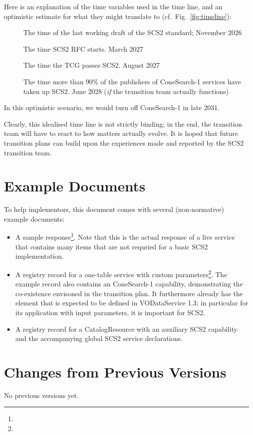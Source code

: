 \documentclass[11pt,a4paper]{ivoa}
\begin{document}
Here is an explanation of the time variables used in the time line, and
an optimistic estimate for what they might translate to
(cf.~Fig.~\ref{fig:timeline}):

\begin{description}
\item [] The time of the last working draft of the SCS2
standard; November 2026

\item[] The time SCS2 RFC starts.  March 2027

\item[] The time the TCG passes SCS2.  August 2027

\item[] The time more than 90\% of the publishers of
ConeSearch-1 services have taken up SCS2.  June 2028 (\textit{if} the
transition team actually functions)

\end{description}

In this optimistic scenario, we would turn off ConeSearch-1 in
late 2031.

Clearly, this idealised time line is not strictly binding; in the end,
the transition team will have to react to how matters actually evolve.
It is hoped that future transition plans can build upon the experiences
made and reported by the SCS2 transition team.

\section{Example Documents}
\label{app:examples}

To help implementors, this document comes with several (non-normative)
example documents:

\begin{itemize}
\item A sample response\footnote{}.
Note that this is the actual response of a live service that contains
many items that are not requried for a basic SCS2 implementation.

\item A registry record for a one-table service with custom
parameters\footnote{}.
The example record also contains an ConeSearch-1 capability,
demonstrating the co-existence envisoned in the transition plan.
It furthermore already has the  element that is expected to
be defined in VODataService 1.3; in particular for its application with
input parameters, it is important for SCS2.

\item A registry record for a CatalogResource with an auxiliary SCS2
capability and the accompanying global SCS2 service
declarations.
\end{itemize}

\section{Changes from Previous Versions}

No previous versions yet.



\end{document}
